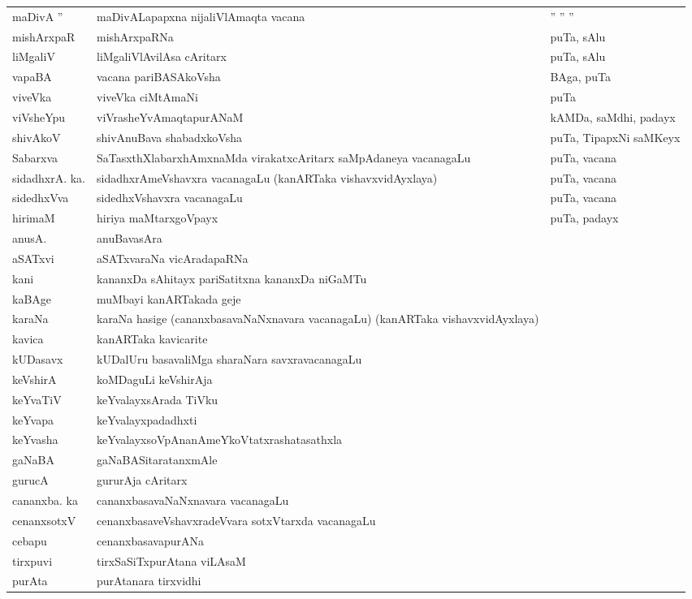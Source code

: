 {\begin{longtable}{l>{\raggedright}p{5cm}l}
maDivA '' & maDivALapapxna nijaliVlAmaqta vacana & \qquad '' '' ''\\
mishArxpaR & mishArxpaRNa & puTa, sAlu\\
liMgaliV & liMgaliVlAvilAsa cAritarx & puTa, sAlu\\
vapaBA & vacana pariBASAkoVsha & BAga, puTa\\
viveVka & viveVka ciMtAmaNi & puTa\\
viVsheYpu & viVrasheYvAmaqtapurANaM & kAMDa, saMdhi, padayx\\
shivAkoV & shivAnuBava shabadxkoVsha & puTa, TipapxNi saMKeyx\\
Sabarxva & SaTasxthXlabarxhAmxnaMda virakatxcAritarx saMpAdaneya vacanagaLu & puTa, vacana\\
sidadhxrA. ka. & sidadhxrAmeVshavxra vacanagaLu (kanARTaka vishavxvidAyxlaya) & puTa, vacana\\
sidedhxVva & sidedhxVshavxra vacanagaLu & puTa, vacana\\
hirimaM & hiriya maMtarxgoVpayx & puTa, padayx\\
anusA. & anuBavasAra & \\
aSATxvi & aSATxvaraNa vicAradapaRNa & \\
kani & kananxDa sAhitayx pariSatitxna kananxDa niGaMTu & \\
kaBAge & muMbayi kanARTakada geje &\\
karaNa  & karaNa hasige (cananxbasavaNaNxnavara vacanagaLu) (kanARTaka vishavxvidAyxlaya) &\\
kavica & kanARTaka kavicarite & \\
kUDasavx & kUDalUru basavaliMga sharaNara savxravacanagaLu & \\
keVshirA & koMDaguLi keVshirAja & \\
keYvaTiV & keYvalayxsArada TiVku & \\
keYvapa & keYvalayxpadadhxti & \\
keYvasha & keYvalayxsoVpAnanAmeYkoVtatxrashatasathxla & \\
gaNaBA & gaNaBASitaratanxmAle & \\
gurucA & gururAja cAritarx & \\
cananxba. ka & cananxbasavaNaNxnavara vacanagaLu & \\
cenanxsotxV & cenanxbasaveVshavxradeVvara sotxVtarxda vacanagaLu & \\
cebapu & cenanxbasavapurANa & \\
tirxpuvi & tirxSaSiTxpurAtana viLAsaM & \\
purAta & purAtanara tirxvidhi & \\

\end{longtable}}
